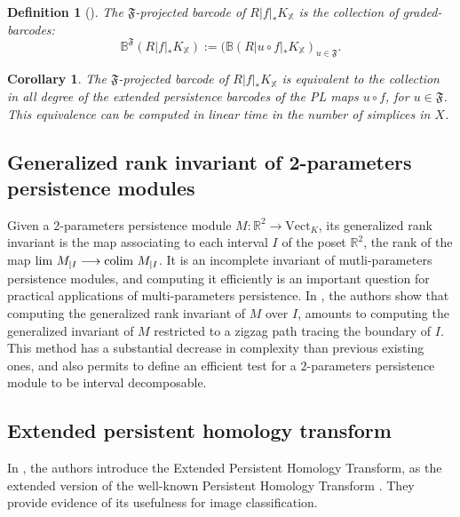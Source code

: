 \documentclass[11pt]{article}
\newtheorem{corollary}[theorem]{Corollary}
\newtheorem{definition}[theorem]{Definition}
\theoremstyle{remark}
\newcommand{\R}{\mathbb{R}}
\begin{document}
\begin{definition}[\cite{BP22}]
The $\mathfrak{F}$-projected barcode of $R |f|_\ast K_\mathbb{X} $ is the collection of graded-barcodes: \[\mathbb{B}^\mathfrak{F}(R |f|_\ast K_\mathbb{X}) := (\mathbb{B}(R |u\circ f|_\ast K_\mathbb{X})_{u \in \mathfrak{F}}.\]
\end{definition}

\begin{corollary}
The $\mathfrak{F}$-projected barcode of $R |f|_\ast K_\mathbb{X} $ is equivalent to the collection in all degree of the extended persistence barcodes of the PL maps $u\circ f$, for $u \in \mathfrak{F}$. This equivalence can be computed in linear time in the number of simplices in $X$.
\end{corollary}


\subsection{Generalized rank invariant of 2-parameters persistence modules}

Given a $2$-parameters persistence module $M : \R^2 \longrightarrow \mathrm{Vect}_K$, its generalized rank invariant is the map associating to each interval $I$ of the poset $\R^2$, the rank of the map
$\textnormal{lim}~ M_{|I} \longrightarrow \textnormal{colim}~ M_{|I}$. It is an incomplete invariant of mutli-parameters persistence modules, and computing it efficiently is an important question for practical applications of multi-parameters persistence. In \cite{Kim21}, the authors show that computing the generalized rank invariant of $M$ over $I$, amounts to computing the generalized invariant of $M$ restricted to a zigzag path tracing the boundary of $I$. This method has a substantial decrease in complexity than previous existing ones, and also permits to define an efficient test for a $2$-parameters persistence module to be interval decomposable. 


\subsection{Extended persistent homology transform}

In \cite{Tur22}, the authors introduce the Extended Persistent Homology Transform, as the extended version of the well-known Persistent Homology Transform \cite{Tur13}. They provide evidence of its usefulness for image classification.

\end{document}
